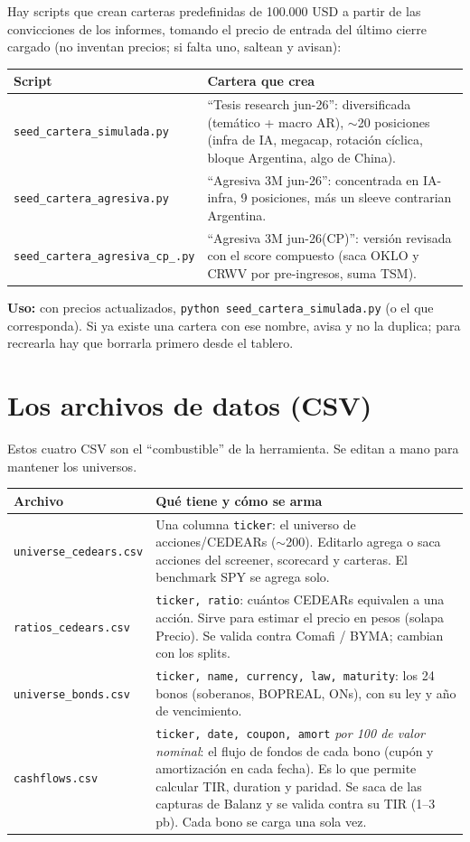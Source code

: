 \documentclass[11pt,a4paper]{article}
\newcommand{\code}[1]{\texttt{#1}}
\newcommand{\fpath}[1]{\texttt{#1}}
\begin{document}
Hay scripts que crean carteras predefinidas de 100.000 USD a partir de las
convicciones de los informes, tomando el precio de entrada del \'ultimo cierre cargado
(no inventan precios; si falta uno, saltean y avisan):

\begin{longtable}{L{5.3cm} L{8.7cm}}
\toprule
\textbf{Script} & \textbf{Cartera que crea} \\
\midrule
\endhead
\fpath{seed\_cartera\_simulada.py} & ``Tesis research jun-26'': diversificada (tem\'atico + macro AR), $\sim$20 posiciones (infra de IA, megacap, rotaci\'on c\'iclica, bloque Argentina, algo de China). \\
\fpath{seed\_cartera\_agresiva.py} & ``Agresiva 3M jun-26'': concentrada en IA-infra, 9 posiciones, m\'as un sleeve contrarian Argentina. \\
\fpath{seed\_cartera\_agresiva\allowbreak\_cp\_.py} & ``Agresiva 3M jun-26(CP)'': versi\'on revisada con el score compuesto (saca OKLO y CRWV por pre-ingresos, suma TSM). \\
\bottomrule
\end{longtable}

\noindent\textbf{Uso:} con precios actualizados, \code{python seed\_cartera\_simulada.py}
(o el que corresponda). Si ya existe una cartera con ese nombre, avisa y no la
duplica; para recrearla hay que borrarla primero desde el tablero.

\section{Los archivos de datos (CSV)}

Estos cuatro CSV son el ``combustible'' de la herramienta. Se editan a mano para
mantener los universos.

\begin{longtable}{L{4.0cm} L{10.1cm}}
\toprule
\textbf{Archivo} & \textbf{Qu\'e tiene y c\'omo se arma} \\
\midrule
\endhead
\fpath{universe\_cedears.csv} & Una columna \code{ticker}: el universo de
acciones/CEDEARs ($\sim$200). Editarlo agrega o saca acciones del screener, scorecard
y carteras. El benchmark SPY se agrega solo. \\
\addlinespace
\fpath{ratios\_cedears.csv} & \code{ticker, ratio}: cu\'antos CEDEARs equivalen a una
acci\'on. Sirve para estimar el precio en pesos (solapa Precio). Se valida contra
Comafi / BYMA; cambian con los splits. \\
\addlinespace
\fpath{universe\_bonds.csv} & \code{ticker, name, currency, law, maturity}: los 24
bonos (soberanos, BOPREAL, ONs), con su ley y a\~no de vencimiento. \\
\addlinespace
\fpath{cashflows.csv} & \code{ticker, date, coupon, amort} \emph{por 100 de valor
nominal}: el flujo de fondos de cada bono (cup\'on y amortizaci\'on en cada fecha). Es
lo que permite calcular TIR, duration y paridad. Se saca de las capturas de Balanz y
se valida contra su TIR (1--3 pb). Cada bono se carga una sola vez. \\
\bottomrule
\end{longtable}
\end{document}
